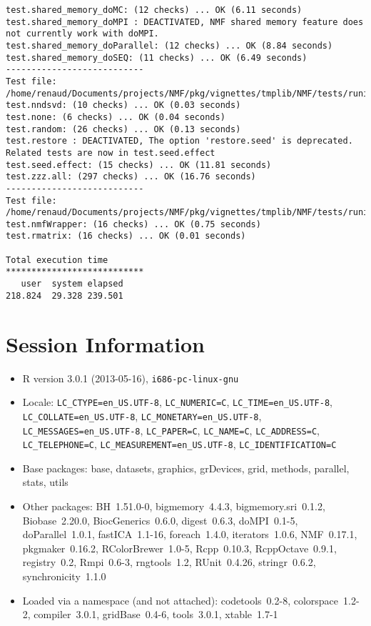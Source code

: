 \documentclass[10pt]{article}
\begin{document}
\begin{verbatim}
test.shared_memory_doMC: (12 checks) ... OK (6.11 seconds)
test.shared_memory_doMPI : DEACTIVATED, NMF shared memory feature does not currently work with doMPI.
test.shared_memory_doParallel: (12 checks) ... OK (8.84 seconds)
test.shared_memory_doSEQ: (11 checks) ... OK (6.49 seconds)
--------------------------- 
Test file: /home/renaud/Documents/projects/NMF/pkg/vignettes/tmplib/NMF/tests/runit.seed.r 
test.nndsvd: (10 checks) ... OK (0.03 seconds)
test.none: (6 checks) ... OK (0.04 seconds)
test.random: (26 checks) ... OK (0.13 seconds)
test.restore : DEACTIVATED, The option 'restore.seed' is deprecated. Related tests are now in test.seed.effect
test.seed.effect: (15 checks) ... OK (11.81 seconds)
test.zzz.all: (297 checks) ... OK (16.76 seconds)
--------------------------- 
Test file: /home/renaud/Documents/projects/NMF/pkg/vignettes/tmplib/NMF/tests/runit.utils.r 
test.nmfWrapper: (16 checks) ... OK (0.75 seconds)
test.rmatrix: (16 checks) ... OK (0.01 seconds)

Total execution time
***************************
   user  system elapsed 
218.824  29.328 239.501 

\end{verbatim}

\section*{Session Information}
\begin{itemize}\raggedright
  \item R version 3.0.1 (2013-05-16), \verb|i686-pc-linux-gnu|
  \item Locale: \verb|LC_CTYPE=en_US.UTF-8|, \verb|LC_NUMERIC=C|, \verb|LC_TIME=en_US.UTF-8|, \verb|LC_COLLATE=en_US.UTF-8|, \verb|LC_MONETARY=en_US.UTF-8|, \verb|LC_MESSAGES=en_US.UTF-8|, \verb|LC_PAPER=C|, \verb|LC_NAME=C|, \verb|LC_ADDRESS=C|, \verb|LC_TELEPHONE=C|, \verb|LC_MEASUREMENT=en_US.UTF-8|, \verb|LC_IDENTIFICATION=C|
  \item Base packages: base, datasets, graphics, grDevices, grid,
    methods, parallel, stats, utils
  \item Other packages: BH~1.51.0-0, bigmemory~4.4.3,
    bigmemory.sri~0.1.2, Biobase~2.20.0, BiocGenerics~0.6.0,
    digest~0.6.3, doMPI~0.1-5, doParallel~1.0.1, fastICA~1.1-16,
    foreach~1.4.0, iterators~1.0.6, NMF~0.17.1, pkgmaker~0.16.2,
    RColorBrewer~1.0-5, Rcpp~0.10.3, RcppOctave~0.9.1, registry~0.2,
    Rmpi~0.6-3, rngtools~1.2, RUnit~0.4.26, stringr~0.6.2,
    synchronicity~1.1.0
  \item Loaded via a namespace (and not attached): codetools~0.2-8,
    colorspace~1.2-2, compiler~3.0.1, gridBase~0.4-6, tools~3.0.1,
    xtable~1.7-1
\end{itemize}
\end{document}
